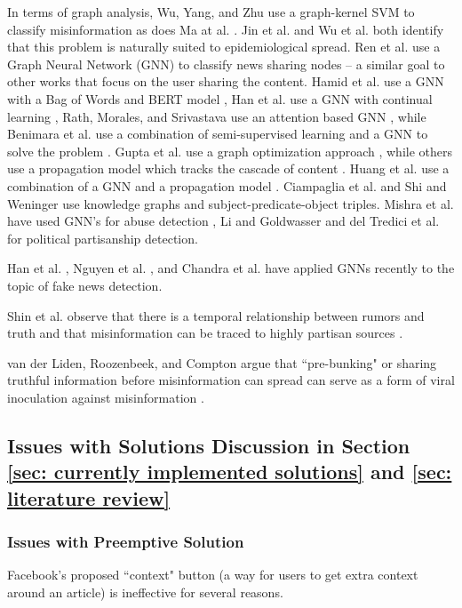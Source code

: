 \documentclass[preprint,review,12pt]{elsarticle}
\begin{document}
In terms of graph analysis, Wu, Yang, and Zhu \cite{wu2015false} use a graph-kernel SVM to classify misinformation as does Ma at al. \cite{ma2017detect}. Jin et al. \cite{jin2013epidemiological} and Wu et al. \cite{wu2016mining} both identify that this problem is naturally suited to epidemiological spread. Ren et al. use a Graph Neural Network (GNN) to classify news sharing nodes \cite{ren2020adversarial} -- a similar goal to other works that focus on the user sharing the content. Hamid et al. use a GNN with a Bag of Words and BERT model \cite{hamid2020fake}, Han et al. use a GNN with continual learning \cite{han2020graph}, Rath, Morales, and Srivastava use an attention based GNN \cite{rath2021scarlet}, while Benimara et al. use a combination of semi-supervised learning and a GNN to solve the problem \cite{benamira2019semi}.  Gupta et al. use a graph optimization approach \cite{gupta2012evaluating}, while others use a propagation model which tracks the cascade of content \cite{jin2016news,jin2014news,zhou2018fake,kashima2003marginalized}. Huang et al. use a combination of a GNN and a propagation model \cite{huang2019deep}. Ciampaglia et al. \cite{ciampaglia2015computational} and Shi and Weninger \cite{shi2016discriminative} use knowledge graphs and subject-predicate-object triples. Mishra et al. have used GNN's for abuse detection \cite{mishra2019abusive}, Li and Goldwasser \cite{li2019encoding} and del Tredici et al. \cite{del2019you} for political partisanship detection. 


Han et al. \cite{han2020graph}, Nguyen et al. \cite{nguyen2020fang}, and Chandra et al. \cite{chandra2020graph} have applied GNNs recently to the topic of fake news detection. 

 Shin et al. observe that there is a temporal relationship between rumors and truth and that misinformation can be traced to highly partisan sources \cite{shin2018diffusion}.
 
 
 van der Liden, Roozenbeek, and Compton argue that ``pre-bunking" or sharing truthful information before misinformation can spread can serve as a form of viral inoculation against misinformation \cite{van2020inoculating}.
 
 \subsection{Issues with Solutions Discussion in Section \ref{sec: currently implemented solutions} and \ref{sec: literature review}}
 \subsubsection{Issues with Preemptive Solution}
 Facebook's proposed ``context" button (a way for users to get extra context around an article) is ineffective for several reasons. 
 
\end{document}
